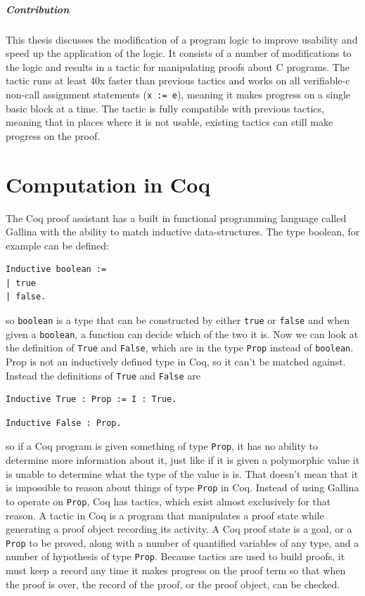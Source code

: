 \documentclass{puthesis}
\begin{document}
\paragraph{Contribution}
This thesis discusses the modification of a program logic to improve
usability and speed up the application of the logic. It consists of a
number of modifications to the logic and results in a tactic for
manipulating proofs about C programs. The tactic runs at least 40x
faster than previous tactics and works on all verifiable-c non-call
assignment statements (\lstinline|x := e|), meaning it makes progress
on a single basic block at a time. The tactic is fully compatible with
previous tactics, meaning that in places where it is not usable,
existing tactics can still make progress on the proof.

\chapter{Computation in Coq}

The Coq proof assistant has a built in functional programming language
called Gallina with the ability to match inductive data-structures. The type
boolean, for example can be defined:

\begin{verbatim}
Inductive boolean :=
| true
| false.
\end{verbatim}

so \lstinline|boolean| is a type that can be constructed by either
\lstinline|true| or \lstinline|false| and when given a
\lstinline|boolean|, a function can decide which of the two it is. Now
we can look at the definition of \lstinline|True| and
\lstinline|False|, which are in the type
\lstinline|Prop| instead of \lstinline|boolean|. Prop is not an
inductively defined type in Coq, so it can't be matched
against. Instead the definitions of \lstinline|True| and \lstinline|False|
are

\begin{verbatim}
Inductive True : Prop := I : True.
\end{verbatim}
\begin{verbatim}
Inductive False : Prop.
\end{verbatim}

\noindent so if a Coq program is given something of type
\lstinline|Prop|, it has no ability to determine more information
about it, just like if it is given a polymorphic value it is unable to
determine what the type of the value is is. That doesn't mean that it
is impossible to reason about things of type \lstinline|Prop| in
Coq. Instead of using Gallina to operate on \lstinline|Prop|, Coq has
tactics, which exist almost exclusively for that reason. A tactic in
Coq is a program that manipulates a proof state while generating a
proof object recording its activity. A Coq proof state is
a goal, or a \lstinline|Prop| to be proved, along with a number of
quantified variables of any type, and a number of hypothesis of type
\lstinline|Prop|. Because tactics are used to build proofs, it must keep a
record any time it makes progress on the proof term so that when the
proof is over, the record of the proof, or the proof object, can be
checked.
\end{document}
